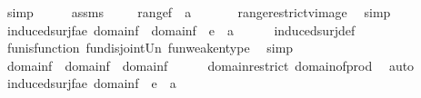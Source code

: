 \begin{isabellebody}
\ simp\isanewline
\ \ \isamarkupfalse%
\ \isamarkupfalse%
\ assms\ \isanewline
\ \ \isamarkupfalse%
\ {\isachardoublequoteopen}range{\isacharparenleft}{\kern0pt}{\isacharquery}{\kern0pt}f{}{\isacharparenright}{\kern0pt}\ {\isasymsubseteq}\ a{\isachardoublequoteclose}\ \isanewline
\ \ \ \ \isamarkupfalse%
\ range{\isacharunderscore}{\kern0pt}restrict{\isacharunderscore}{\kern0pt}vimage\ \isamarkupfalse%
\ simp\isanewline
\ \ \isamarkupfalse%
\ \isanewline
\ \ \isamarkupfalse%
\ {\isachardoublequoteopen}induced{\isacharunderscore}{\kern0pt}surj{\isacharparenleft}{\kern0pt}f{\isacharcomma}{\kern0pt}a{\isacharcomma}{\kern0pt}e{\isacharparenright}{\kern0pt}{\isacharcolon}{\kern0pt}\ domain{\isacharparenleft}{\kern0pt}{\isacharquery}{\kern0pt}f{}{\isacharparenright}{\kern0pt}\ {\isasymunion}\ domain{\isacharparenleft}{\kern0pt}{\isacharquery}{\kern0pt}f{}{\isacharparenright}{\kern0pt}\ {\isasymrightarrow}\ {\isacharbraceleft}{\kern0pt}e{\isacharbraceright}{\kern0pt}\ {\isasymunion}\ a{\isachardoublequoteclose}\isanewline
\ \ \ \ \isamarkupfalse%
\ induced{\isacharunderscore}{\kern0pt}surj{\isacharunderscore}{\kern0pt}def\ \isamarkupfalse%
\ fun{\isacharunderscore}{\kern0pt}is{\isacharunderscore}{\kern0pt}function\ fun{\isacharunderscore}{\kern0pt}disjoint{\isacharunderscore}{\kern0pt}Un\ fun{\isacharunderscore}{\kern0pt}weaken{\isacharunderscore}{\kern0pt}type\ \isamarkupfalse%
\ simp\isanewline
\ \ \isamarkupfalse%
\ \isanewline
\ \ \isamarkupfalse%
\ {\isachardoublequoteopen}domain{\isacharparenleft}{\kern0pt}{\isacharquery}{\kern0pt}f{}{\isacharparenright}{\kern0pt}\ {\isasymunion}\ domain{\isacharparenleft}{\kern0pt}{\isacharquery}{\kern0pt}f{}{\isacharparenright}{\kern0pt}\ {\isacharequal}{\kern0pt}\ domain{\isacharparenleft}{\kern0pt}f{\isacharparenright}{\kern0pt}{\isachardoublequoteclose}\isanewline
\ \ \ \ \isamarkupfalse%
\ domain{\isacharunderscore}{\kern0pt}restrict\ domain{\isacharunderscore}{\kern0pt}of{\isacharunderscore}{\kern0pt}prod\ \isamarkupfalse%
\ auto\ \isanewline
\ \ \isamarkupfalse%
\isanewline
\ \ \isamarkupfalse%
\ {\isachardoublequoteopen}induced{\isacharunderscore}{\kern0pt}surj{\isacharparenleft}{\kern0pt}f{\isacharcomma}{\kern0pt}a{\isacharcomma}{\kern0pt}e{\isacharparenright}{\kern0pt}{\isacharcolon}{\kern0pt}\ domain{\isacharparenleft}{\kern0pt}f{\isacharparenright}{\kern0pt}\ {\isasymrightarrow}\ {\isacharbraceleft}{\kern0pt}e{\isacharbraceright}{\kern0pt}\ {\isasymunion}\ a{\isachardoublequoteclose}\isanewline

\end{isabellebody}
